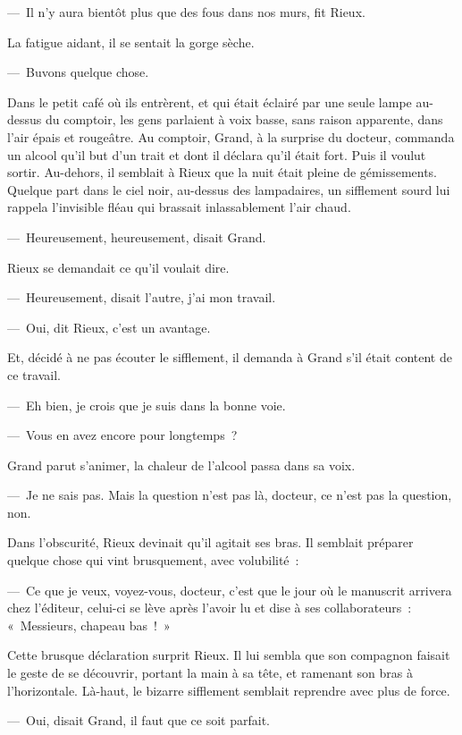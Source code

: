 \documentclass[french,twoside]{book} %
\begin{document}
— Il n’y aura bientôt plus que des fous dans nos murs, fit Rieux.\par
La fatigue aidant, il se sentait la gorge sèche.\par
— Buvons quelque chose.\par
Dans le petit café où ils entrèrent, et qui était éclairé par une seule lampe au-dessus du comptoir, les gens parlaient à voix basse, sans raison apparente, dans l’air épais et rougeâtre. Au comptoir, Grand, à la surprise du docteur, commanda un alcool qu’il but d’un trait et dont il déclara qu’il était fort. Puis il voulut sortir. Au-dehors, il semblait à Rieux que la nuit était pleine de gémissements. Quelque part dans le ciel noir, au-dessus des lampadaires, un sifflement sourd lui rappela l’invisible fléau qui brassait inlassablement l’air chaud.\par
— Heureusement, heureusement, disait Grand.\par
Rieux se demandait ce qu’il voulait dire.\par
— Heureusement, disait l’autre, j’ai mon travail.\par
— Oui, dit Rieux, c’est un avantage.\par
Et, décidé à ne pas écouter le sifflement, il demanda à Grand s’il était content de ce travail.\par
— Eh bien, je crois que je suis dans la bonne voie.\par
— Vous en avez encore pour longtemps ?\par
Grand parut s’animer, la chaleur de l’alcool passa dans sa voix.\par
— Je ne sais pas. Mais la question n’est pas là, docteur, ce n’est pas la question, non.\par
Dans l’obscurité, Rieux devinait qu’il agitait ses bras. Il semblait préparer quelque chose qui vint brusquement, avec volubilité :\par
— Ce que je veux, voyez-vous, docteur, c’est que le jour où le manuscrit arrivera chez l’éditeur, celui-ci se lève après l’avoir lu et dise à ses collaborateurs : « Messieurs, chapeau bas ! »\par
Cette brusque déclaration surprit Rieux. Il lui sembla que son compagnon faisait le geste de se découvrir, portant la main à sa tête, et ramenant son bras à l’horizontale. Là-haut, le bizarre sifflement semblait reprendre avec plus de force.\par
— Oui, disait Grand, il faut que ce soit parfait.\par
\end{document}
